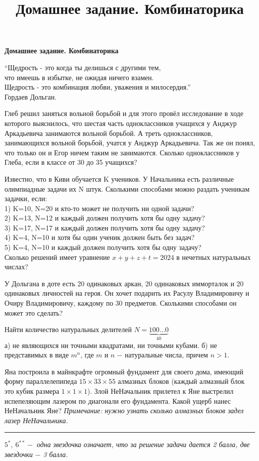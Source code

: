 \centerline{\bf \Huge Домашнее задание. Комбинаторика}
\title{ Домашнее задание. Комбинаторика}

\begin{flushright}
        \scriptsize{“Щедрость - это когда ты делишься с другими тем,\\  что имеешь в избытке, не ожидая ничего взамен.\\ Щедрость - это комбинация любви, уважения и милосердия.”\\Гордаев Дольган.}
\end{flushright}

 Глеб решил заняться вольной борьбой и для этого провёл исследование в ходе которого выяснилось, что шестая часть одноклассников учащихся у Анджур Аркадьевича занимаются вольной борьбой. А треть одноклассников, занимающихся вольной борьбой, учатся у Анджур Аркадьевича. Так же он понял, что только он и Егор ничем таким не занимаются. Сколько одноклассников у Глеба, если в классе от 30 до 35 учащихся?

 Известно, что в Киви обучается K учеников. У Начальника есть различные олимпиадные задачи их N штук. Сколькими способами можно раздать ученикам задачки, если:\\
1) K=10, N=20 и кто-то может не получить ни одной задачи?\\
2) K=13, N=12 и каждый должен получить хотя бы одну задачу?\\
3) K=17, N=17 и каждый должен получить хотя бы одну задачу?\\
4) K=4, N=10 и хотя бы один ученик должен быть без задач?\\
5) K=4, N=10 и каждый должен получить хотя бы одну задачу?\\

 Сколько решений имеет уравнение $x + y + z + t = 2024$ в нечетных натуральных числах?

У Дольгана в доте есть 20 одинаковых аркан, 20 одинаковых имморталок и 20 одинаковых личностей на героя. Он хочет подарить их Расулу Владимировичу и Очиру Владимировичу, каждому по 30 предметов. Сколькими способами он может это сделать?

 Найти количество натуральных делителей $N = \underbrace{100\dotsc0}_\text{40}$\\
а) не являющихся ни точными квадратами, ни точными кубами. 
б) не представимых в виде $m^n$, где $m$ и $n$ $-$ натуральные числа, причем $n>1$.

Яна построила в майнкрафте огромный фундамент для своего дома, имеющий форму параллелепипеда $15\times33\times55$ алмазных блоков (каждый алмазный блок это кубик размера $1\times1\times1$). Злой НеНачальник прилетел к Яне выстрелил испепеляющим лазером по диагонали его фундамента. Какой ущерб нанес НеНачальник Яне? \textit{Примечание: нужно узнать сколько алмазных блоков задел лазер НеНачальника.}


\rule{18cm}{0.2pt}

\textit{$5^{*}, \ 6^{**} -$ одна звездочка означает, что за решение задачи дается 2 балла, две звездочки $-$ 3 балла.}